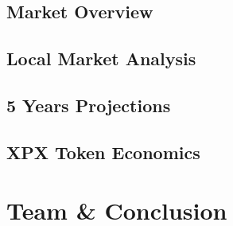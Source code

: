 \documentclass[11pt,fleqn,oneside]{book} %
\begin{document}
\section{Market Overview}

\section{Local Market Analysis}

\section{5 Years Projections}

\section{XPX Token Economics}



\chapter{Team \& Conclusion}
\end{document}
